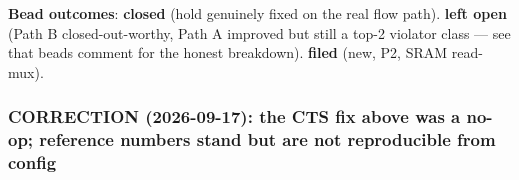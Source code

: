 \begin{record}
\textbf{Bead outcomes}:  \textbf{closed} (hold genuinely fixed
on the real flow path).  \textbf{left open} (Path B
closed-out-worthy, Path A improved but still a top-2 violator class ---
see that bead\textquotesingle s comment for the honest breakdown).
 \textbf{filed} (new, P2, SRAM read-mux).

\end{record}

\subsubsection{CORRECTION (2026-09-17): the CTS fix above was a no-op;
reference numbers stand but are not reproducible from config}\label{cr:run:phase5:correction-2026-09-17-the-cts-fix-above-was-a-no-op-reference-numbers-stand-but-are-not-reproducible-from-config}

